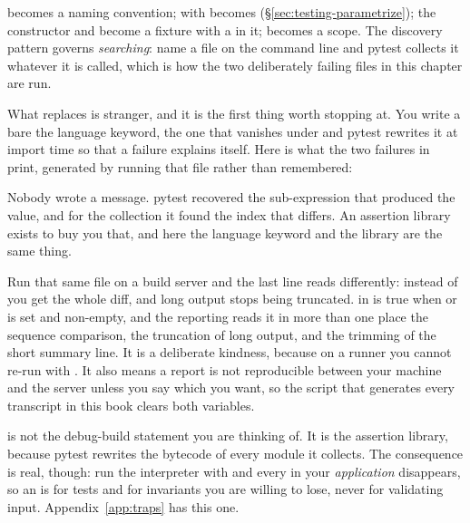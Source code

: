 
\begin{csbox}
\code{[Fact]} becomes a naming convention; \code{[Theory]} with
\code{[InlineData]} becomes 
(\S\ref{sec:testing-parametrize}); the constructor and 
become a fixture with a  in it;  becomes
a scope. The discovery pattern governs \emph{searching}: name a file on the
command line and pytest collects it whatever it is called, which is how the
two deliberately failing files in this chapter are run.
\end{csbox}

\noindent
What replaces  is stranger, and it is the first thing
worth stopping at. You write a bare  \dash{} the language
keyword, the one that vanishes under  \dash{} and pytest rewrites
it at import time so that a failure explains itself. Here is what the two
failures in  print, generated by running
that file rather than remembered:


\noindent
Nobody wrote a message. pytest recovered the sub-expression that produced
the value, and for the collection it found the index that differs. An
assertion library exists to buy you that, and here the language keyword and
the library are the same thing.

\begin{warning}
Run that same file on a build server and the last line reads differently:
instead of  you get the whole
 diff, and long output stops being truncated.
 in  is true when
 or  is set and non-empty, and the reporting
reads it in more than one place \dash{} the sequence comparison, the
truncation of long output, and the trimming of the short summary line. It
is a deliberate kindness, because on a runner you cannot re-run with
. It also means a report is not reproducible between your machine
and the server unless you say which you want, so the script that generates
every transcript in this book clears both variables.
\end{warning}

\begin{trapbox}
 is not the debug-build statement you are thinking of. It is
the assertion library, because pytest rewrites the bytecode of every module
it collects. The consequence is real, though: run the interpreter with
 and every  in your \emph{application} disappears, so
an  is for tests and for invariants you are willing to lose,
never for validating input. Appendix~\ref{app:traps} has this one.
\end{trapbox}

